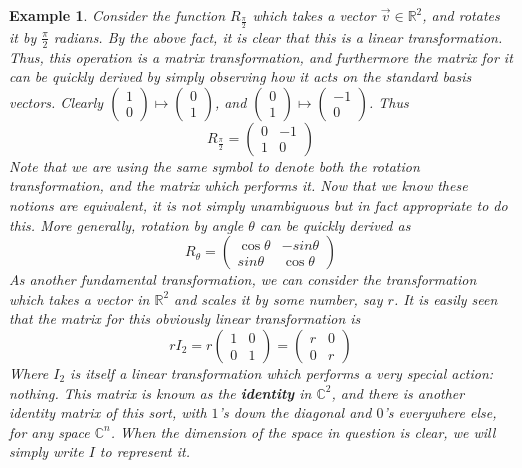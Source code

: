 \documentclass{article}
\theoremstyle{definition}
\theoremstyle{plain}
\newtheorem{example}{Example}[section]
\theoremstyle{theorem}
\begin{document}
\begin{example}
	Consider the function $R_{\frac{\pi}{2}}$ which takes a vector $\vec{v} \in \mathbb{R}^2$, and rotates it by $\frac{\pi}{2}$ radians. By the above fact, it is clear that this is a linear transformation. Thus, this operation is a matrix transformation, and furthermore the matrix for it can be quickly derived by simply observing how it acts on the standard basis vectors. Clearly $\begin{pmatrix} 1 \\ 0 \end{pmatrix} \mapsto \begin{pmatrix} 0 \\ 1 \end{pmatrix}$, and $\begin{pmatrix} 0 \\ 1 \end{pmatrix} \mapsto \begin{pmatrix} -1 \\ 0 \end{pmatrix}$. Thus
	\[ R_{\frac{\pi}{2}} = \begin{pmatrix} 0 & -1 \\ 1 & 0 \end{pmatrix} \]
Note that we are using the \textit{same symbol} to denote both the rotation transformation, and the matrix which performs it. Now that we know these notions are equivalent, it is not simply unambiguous but in fact appropriate to do this. More generally, rotation by angle $\theta$ can be quickly derived as 
	\[ R_{\theta} = \begin{pmatrix} \cos\theta & -sin\theta \\ sin\theta & \cos\theta \end{pmatrix} \]
As another fundamental transformation, we can consider the transformation which takes a vector in $\mathbb{R}^2$ and scales it by some number, say $r$. It is easily seen that the matrix for this obviously linear transformation is 
 	\[ rI_2 = r\begin{pmatrix} 1 & 0 \\ 0 & 1 \end{pmatrix} = \begin{pmatrix} r & 0 \\ 0 & r \end{pmatrix} \] 
 	Where $I_2$ is itself a linear transformation which performs a very special action: \textit{nothing}. This matrix is known as the \textbf{identity} in $\mathbb{C}^2$, and there is another identity matrix of this sort, with $1$'s down the diagonal and $0$'s everywhere else, for any space $\mathbb{C}^n$. When the dimension of the space in question is clear, we will simply write $I$ to  represent it. 
\end{example}
\end{document}
